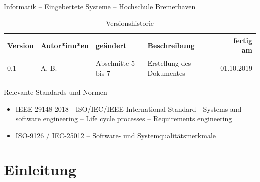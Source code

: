 \begin{center}
  \makeatletter
  \textbf{
    \@title
  }
  \makeatother
  \\[1em]
  Informatik -- Eingebettete Systeme -- Hochschule Bremerhaven
\end{center}

\begin{table}[ht]
  \centering
  \begin{tabular}[t]{|p{15mm}|p{30mm}|p{30mm}|p{50mm}|r|}
    \hline
    \textbf{Version} & \textbf{Autor*inn*en} & \textbf{geändert} & \textbf{Beschreibung} & \textbf{fertig am}\\
    \hline
    0.1              & A. B.            &  Abschnitte 5 bis 7  & Erstellung des Dokumentes & 01.10.2019\\
    \hline
  \end{tabular}
  \caption{Versionshistorie}
\end{table}

\vspace*{4em}

Relevante Standards und Normen
\begin{itemize}
\item IEEE 29148-2018 - ISO/IEC/IEEE International Standard - Systems
  and software engineering -- Life cycle processes -- Requirements
  engineering

  \cite{ieee-29148-2018-requirements-engineering}
\item ISO-9126 / IEC-25012 -- Software- und Systemqualitätsmerkmale

  \cite{iso-iec-25012-2008-product-quality}
\end{itemize}
\clearpage

\chapter{Einleitung}
\label{srs:einleitung}


